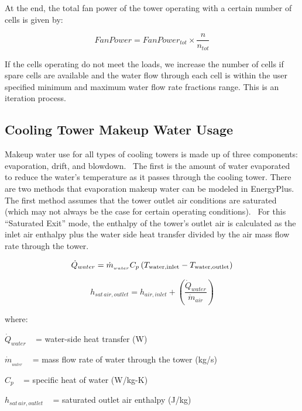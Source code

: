 At the end, the total fan power of the tower operating with a certain number of cells is given by:

\begin{equation}
FanPower = FanPowe{r_{tot}} \times \frac{n}{{{n_{tot}}}}
\end{equation}

If the cells operating do not meet the loads, we increase the number of cells if spare cells are available and the water flow through each cell is within the user specified minimum and maximum water flow rate fractions range. This is an iteration process.

\subsection{Cooling Tower Makeup Water Usage}\label{cooling-tower-makeup-water-usage-1}

Makeup water use for all types of cooling towers is made up of three components: evaporation, drift, and blowdown. ~The first is the amount of water evaporated to reduce the water's temperature as it passes through the cooling tower. There are two methods that evaporation makeup water can be modeled in EnergyPlus.~ The first method assumes that the tower outlet air conditions are saturated (which may not always be the case for certain operating conditions). ~For this ``Saturated Exit'' mode, the enthalpy of the tower's outlet air is calculated as the inlet air enthalpy plus the water side heat transfer divided by the air mass flow rate through the tower.

\begin{equation}
{\dot Q_{water}} = {\dot m_{_{water}}}{C_p}\left( {{T_{{\rm{water,inlet}}}} - {T_{{\rm{water,outlet}}}}} \right)
\end{equation}

\begin{equation}
{h_{sat\,air,outlet}} = {h_{air,inlet}} + \left( {\frac{{{{\dot Q}_{water}}}}{{{{\dot m}_{air}}}}} \right)
\end{equation}

where:

\({\dot Q_{water}}\) ~ = water-side heat transfer (W)

\({\dot m_{_{water}}}\) ~ = mass flow rate of water through the tower (kg/s)

\({C_p}\) ~ = specific heat of water (W/kg-K)

\({h_{sat\,air,outlet}}\) ~ = saturated outlet air enthalpy (J/kg)

